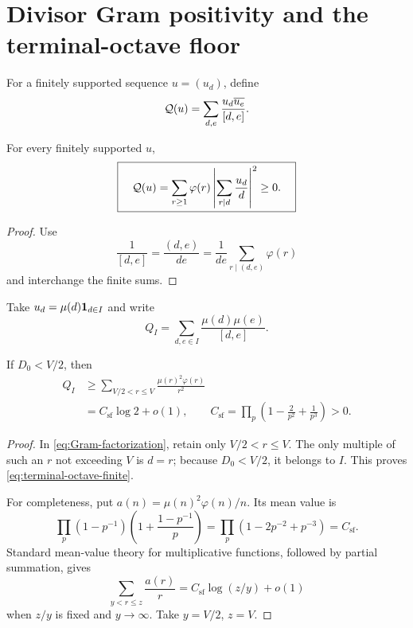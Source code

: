 \section{Divisor Gram positivity and the terminal-octave floor}
\label{sec:gram}

For a finitely supported sequence $u=(u_d)$, define
\begin{equation}
 \mathcal Q(u)=\sum_{d,e}\frac{u_d\overline{u_e}}{[d,e]}.
 \label{eq:Gram-Q}
\end{equation}

\begin{lemma}
\label{lem:Gram-factorization}
For every finitely supported $u$,
\begin{equation}
 \boxed{\quad
 \mathcal Q(u)=\sum_{r\ge1}\varphi(r)
 \left|\sum_{r\mid d}\frac{u_d}{d}\right|^2\ge0.
 \quad}
 \label{eq:Gram-factorization}
\end{equation}
\end{lemma}

\begin{proof}
Use
\[
 \frac1{[d,e]}=\frac{(d,e)}{de}
 =\frac1{de}\sum_{r\mid(d,e)}\varphi(r)
\]
and interchange the finite sums.
\end{proof}

Take $u_d=\mu(d)\mathbf 1_{d\in I}$ and write
\begin{equation}
 Q_I=\sum_{d,e\in I}\frac{\mu(d)\mu(e)}{[d,e]}.
 \label{eq:QI}
\end{equation}

\begin{theorem}
\label{thm:terminal-octave}
If $D_0<V/2$, then
\begin{align}
 Q_I
 &\ge\sum_{V/2<r\le V}\frac{\mu(r)^2\varphi(r)}{r^2}
 \label{eq:terminal-octave-finite}\\
 &=C_{\mathrm{sf}}\log2+o(1),
 \qquad
 C_{\mathrm{sf}}=\prod_p
 \left(1-\frac2{p^2}+\frac1{p^3}\right)>0.
 \label{eq:terminal-octave-asymptotic}
\end{align}
\end{theorem}

\begin{proof}
In \eqref{eq:Gram-factorization}, retain only $V/2<r\le V$.
The only multiple of such an $r$ not exceeding $V$ is $d=r$; because
$D_0<V/2$, it belongs to $I$.  This proves
\eqref{eq:terminal-octave-finite}.

For completeness, put $a(n)=\mu(n)^2\varphi(n)/n$.  Its mean value is
\[
 \prod_p(1-p^{-1})\left(1+\frac{1-p^{-1}}p\right)
 =\prod_p\left(1-2p^{-2}+p^{-3}\right)=C_{\mathrm{sf}}.
\]
Standard mean-value theory for multiplicative functions, followed by
partial summation, gives
\[
 \sum_{y<r\le z}\frac{a(r)}r
 =C_{\mathrm{sf}}\log(z/y)+o(1)
\]
when $z/y$ is fixed and $y\to\infty$.  Take $y=V/2$, $z=V$.
\end{proof}

